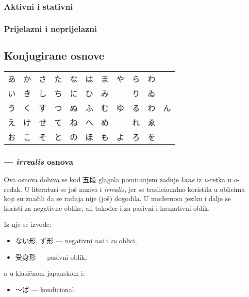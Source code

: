 \documentclass[a4paper, 12pt]{amsart}
\newcommand{\f}[2]{\ruby{#1}{\smash{\sffamily{#2}}}\CJKglue}
\begin{document}
  \subsubsection*{Aktivni i stativni}

  \subsubsection*{Prijelazni i neprijelazni}

  \subsection{Konjugirane osnove}
  \begin{center}
    \begin{tabular}{ccccccccccc}
      あ & か & さ & た & な & は & ま & や & ら & わ & \\
      い & き & し & ち & に & ひ & み &   & り & ゐ & \\
      う & く & す & つ & ぬ & ふ & む & ゆ & る & わ & ん \\
      え & け & せ & て & ね & へ & め &   & れ & ゑ & \\
      お & こ & そ & と & の & ほ & も & よ & ろ & を &  \\
    \end{tabular}
  \end{center}

  \subsubsection*{\f{未}{み}\f{然}{ぜん}\f{形}{けい} --- \textit{irrealis} osnova}
  Ova osnova dobiva se kod 五段 glagola pomicanjem zadnje \textit{kane} iz \textit{u}-retka u \textit{a}-redak.
  U literaturi se još naziva i \textit{irrealis}, jer se tradicionalno koristila u oblicima koji su značili da se radnja nije (još) dogodila.
  U modernom jeziku i dalje se koristi za negativne oblike, ali također i za pasivni i kauzativni oblik.

  Iz nje se izvode:
  \begin{itemize}
    \item ない形, ず形 --- negativni \textit{nai} i \textit{zu} oblici,
    \item 受身形 --- pasivni oblik,
  \end{itemize}
  a u klasičnom japanskom i:
  \begin{itemize}
    \item 〜ば --- kondicional.
  \end{itemize}
\end{document}
